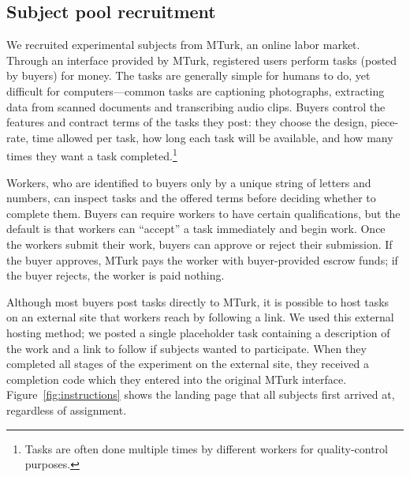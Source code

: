 \documentclass[11pt]{article}
\begin{document}
\subsection{Subject pool recruitment} 
We recruited experimental subjects from MTurk, an online labor market.
Through an interface provided by MTurk, registered users perform tasks (posted by buyers) for money. 
The tasks are generally simple for humans to do, yet difficult for computers---common tasks are captioning photographs, extracting data from scanned documents and transcribing audio clips.
Buyers control the features and contract terms of the tasks they post: they choose the design, piece-rate, time allowed per task, how long each task will be available, and how many times they want a task completed.\footnote{
  Tasks are often done multiple times by different workers for quality-control purposes.
}

Workers, who are identified to buyers only by a unique string of letters and numbers, can inspect tasks and the offered terms before deciding whether to complete them.
Buyers can require workers to have certain qualifications, but the default is that workers can ``accept'' a task immediately and begin work.
Once the workers submit their work, buyers can approve or reject their submission.
If the buyer approves, MTurk pays the worker with buyer-provided escrow funds; if the buyer rejects, the worker is paid nothing. 
 
Although most buyers post tasks directly to MTurk, it is possible to host tasks on an external site that workers reach by following a link.
We used this external hosting method; we posted a single placeholder task containing a description of the work and a link to follow if subjects wanted to participate.
When they completed all stages of the experiment on the external site, they received a completion code which they entered into the original MTurk interface. 
Figure~\ref{fig:instructions} shows the landing page that all subjects first arrived at, regardless of assignment.
\end{document}
